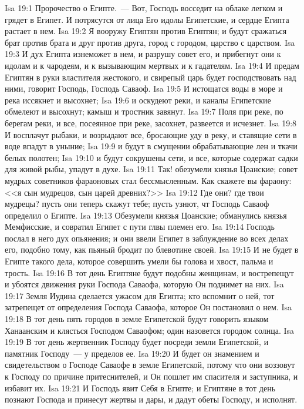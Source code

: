 \vs Isa 19:1 Пророчество о Египте.~--- Вот, Господь восседит на облаке легком и грядет в Египет. И потрясутся от лица Его идолы Египетские, и сердце Египта растает в нем.
\vs Isa 19:2 Я вооружу Египтян против Египтян; и будут сражаться брат против брата и друг против друга, город с городом, царство с царством.
\vs Isa 19:3 И дух Египта изнеможет в нем, и разрушу совет его, и прибегнут они к идолам и к чародеям, и к вызывающим мертвых и к гадателям.
\vs Isa 19:4 И предам Египтян в руки властителя жестокого, и свирепый царь будет господствовать над ними, говорит Господь, Господь Саваоф.
\vs Isa 19:5 И истощатся воды в море и река иссякнет и высохнет;
\vs Isa 19:6 и оскудеют реки, и каналы Египетские обмелеют и высохнут; камыш и тростник завянут.
\vs Isa 19:7 Поля при реке, по берегам реки, и все, посеянное при реке, засохнет, развеется и исчезнет.
\vs Isa 19:8 И восплачут рыбаки, и возрыдают все, бросающие уду в реку, и ставящие сети в воде впадут в уныние;
\vs Isa 19:9 и будут в смущении обрабатывающие лен и ткачи белых полотен;
\vs Isa 19:10 и будут сокрушены сети, и все, которые содержат садки для живой рыбы, упадут в духе.
\vs Isa 19:11 Так! обезумели князья Цоанские; совет мудрых советников фараоновых стал бессмысленным. Как скажете вы фараону: <<я сын мудрецов, сын царей древних?>>
\vs Isa 19:12 Где они? где твои мудрецы? пусть они теперь скажут тебе; пусть узнют, чт Господь Саваоф определил о Египте.
\vs Isa 19:13 Обезумели князья Цоанские; обманулись князья Мемфисские, и совратил Египет с пути глвы племен его.
\vs Isa 19:14 Господь послал в него дух опьянения; и они ввели Египет в заблуждение во всех делах его, подобно тому, как пьяный бродит по блевотине своей.
\vs Isa 19:15 И не будет в Египте такого дела, которое совершить умели бы голова и хвост, пальма и трость.
\vs Isa 19:16 В тот день Египтяне будут подобны женщинам, и вострепещут и убоятся движения руки Господа Саваофа, которую Он поднимет на них.
\vs Isa 19:17 Земля Иудина сделается ужасом для Египта; кто вспомнит о ней, тот затрепещет от определения Господа Саваофа, которое Он постановил о нем.
\vs Isa 19:18 В тот день пять городов в земле Египетской будут говорить языком Ханаанским и клясться Господом Саваофом; один назовется городом солнца.
\vs Isa 19:19 В тот день жертвенник Господу будет посреди земли Египетской, и памятник Господу~--- у пределов ее.
\vs Isa 19:20 И будет он знамением и свидетельством о Господе Саваофе в земле Египетской, потому что они воззовут к Господу по причине притеснителей, и Он пошлет им спасителя и заступника, и избавит их.
\vs Isa 19:21 И Господь явит Себя в Египте; и Египтяне в тот день познают Господа и принесут жертвы и дары, и дадут обеты Господу, и исполнят.
